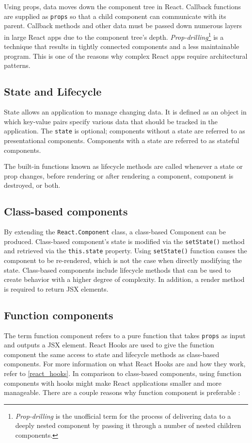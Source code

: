 Using props, data moves down the component tree in React. Callback functions are supplied as \texttt{props} so that a child component can communicate with its parent. Callback methods and other data must be passed down numerous layers in large React apps due to the component tree's depth. \emph{Prop-drilling}\footnote{\emph{Prop-drilling} is the unofficial term for the process of delivering data to a deeply nested component by passing it through a number of nested children components.} is a technique that results in tightly connected components and a less maintainable program. This is one of the reasons why complex React apps require architectural patterns.

\subsection{State and Lifecycle}
State allows an application to manage changing data. It is defined as an object in which key-value pairs specify various data that should be tracked in the application. The \texttt{state} is optional; components without a state are referred to as presentational components. Components with a state are referred to as stateful components.

The built-in functions known as lifecycle methods are called whenever a state or prop changes, before rendering or after rendering a component, component is destroyed, or both.

\subsection{Class-based components}
By extending the \texttt{React.Component} class, a class-based Component can be produced. Class-based component's state is modified via the \texttt{setState()} method and retrieved via the \texttt{this.state} property. Using \texttt{setState()} function causes the component to be re-rendered, which is not the case when directly modifying the state. Class-based components include lifecycle methods that can be used to create behavior with a higher degree of complexity. In addition, a render method is required to return JSX elements.


\subsection{Function components}
The term function component refers to a pure function that takes \texttt{props} as input and outputs a JSX element. React Hooks are used to give the function component the same access to state and lifecycle methods as class-based components. For more information on what React Hooks are and how they work, refer to \autoref{react_hooks}. In comparison to class-based components, using function components with hooks might make React applications smaller and more manageable. There are a couple reasons why function component is preferable \autocite{phan2020react}:

